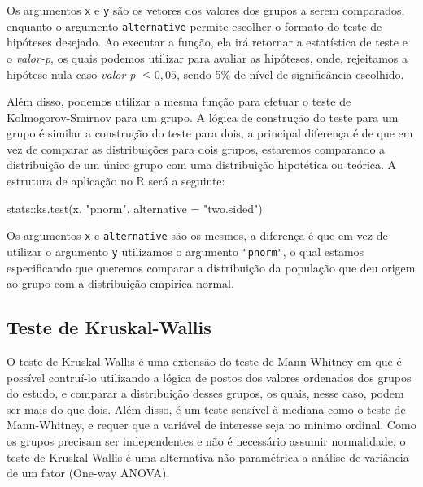 \documentclass[
  letterpaper,
  DIV=11,
  numbers=noendperiod]{scrreprt}
\newenvironment{Shaded}{\begin{snugshade}}{\end{snugshade}}
\newcommand{\AttributeTok}[1]{\textcolor[rgb]{0.40,0.45,0.13}{#1}}
\newcommand{\FunctionTok}[1]{\textcolor[rgb]{0.28,0.35,0.67}{#1}}
\newcommand{\NormalTok}[1]{\textcolor[rgb]{0.00,0.23,0.31}{#1}}
\newcommand{\SpecialCharTok}[1]{\textcolor[rgb]{0.37,0.37,0.37}{#1}}
\newcommand{\StringTok}[1]{\textcolor[rgb]{0.13,0.47,0.30}{#1}}
\begin{document}
Os argumentos \texttt{x} e \texttt{y} são os vetores dos valores dos
grupos a serem comparados, enquanto o argumento \texttt{alternative}
permite escolher o formato do teste de hipóteses desejado. Ao executar a
função, ela irá retornar a estatística de teste e o \emph{valor-p}, os
quais podemos utilizar para avaliar as hipóteses, onde, rejeitamos a
hipótese nula caso \emph{valor-p} \(\leq 0,05\), sendo 5\% de nível de
significância escolhido.

Além disso, podemos utilizar a mesma função para efetuar o teste de
Kolmogorov-Smirnov para um grupo. A lógica de construção do teste para
um grupo é similar a construção do teste para dois, a principal
diferença é de que em vez de comparar as distribuições para dois grupos,
estaremos comparando a distribuição de um único grupo com uma
distribuição hipotética ou teórica. A estrutura de aplicação no R será a
seguinte:

\begin{Shaded}
\begin{Highlighting}[]
\NormalTok{stats}\SpecialCharTok{::}\FunctionTok{ks.test}\NormalTok{(x, }\StringTok{"pnorm"}\NormalTok{, }\AttributeTok{alternative =} \StringTok{"two.sided"}\NormalTok{)}
\end{Highlighting}
\end{Shaded}

Os argumentos \texttt{x} e \texttt{alternative} são os mesmos, a
diferença é que em vez de utilizar o argumento \texttt{y} utilizamos o
argumento \texttt{"pnorm"}, o qual estamos especificando que queremos
comparar a distribuição da população que deu origem ao grupo com a
distribuição empírica normal.

\hypertarget{teste-de-kruskal-wallis}{%
\subsection{Teste de Kruskal-Wallis}\label{teste-de-kruskal-wallis}}

O teste de Kruskal-Wallis é uma extensão do teste de Mann-Whitney em que
é possível contruí-lo utilizando a lógica de postos dos valores
ordenados dos grupos do estudo, e comparar a distribuição desses grupos,
os quais, nesse caso, podem ser mais do que dois. Além disso, é um teste
sensível à mediana como o teste de Mann-Whitney, e requer que a variável
de interesse seja no mínimo ordinal. Como os grupos precisam ser
independentes e não é necessário assumir normalidade, o teste de
Kruskal-Wallis é uma alternativa não-paramétrica a análise de variância
de um fator (One-way ANOVA).
\end{document}
